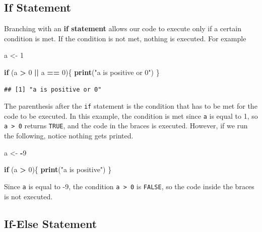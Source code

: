 \documentclass[
]{book}
\newenvironment{Shaded}{\begin{snugshade}}{\end{snugshade}}
\newcommand{\ControlFlowTok}[1]{\textcolor[rgb]{0.13,0.29,0.53}{\textbf{#1}}}
\newcommand{\DecValTok}[1]{\textcolor[rgb]{0.00,0.00,0.81}{#1}}
\newcommand{\FunctionTok}[1]{\textcolor[rgb]{0.13,0.29,0.53}{\textbf{#1}}}
\newcommand{\NormalTok}[1]{#1}
\newcommand{\OtherTok}[1]{\textcolor[rgb]{0.56,0.35,0.01}{#1}}
\newcommand{\SpecialCharTok}[1]{\textcolor[rgb]{0.81,0.36,0.00}{\textbf{#1}}}
\newcommand{\StringTok}[1]{\textcolor[rgb]{0.31,0.60,0.02}{#1}}
\theoremstyle{definition}
\theoremstyle{definition}
\theoremstyle{definition}
\theoremstyle{definition}
\theoremstyle{remark}
\begin{document}
\hypertarget{if-statement}{%
\subsection{If Statement}\label{if-statement}}

Branching with an \textbf{if statement} allows our code to execute only if a certain condition is met. If the condition is not met, nothing is executed. For example

\begin{Shaded}
\begin{Highlighting}[]
\NormalTok{a }\OtherTok{\textless{}{-}} \DecValTok{1}

\ControlFlowTok{if}\NormalTok{ (a }\SpecialCharTok{\textgreater{}} \DecValTok{0} \SpecialCharTok{||}\NormalTok{ a }\SpecialCharTok{==} \DecValTok{0}\NormalTok{)\{}
  \FunctionTok{print}\NormalTok{(}\StringTok{"a is positive or 0"}\NormalTok{)}
\NormalTok{\}}
\end{Highlighting}
\end{Shaded}

\begin{verbatim}
## [1] "a is positive or 0"
\end{verbatim}

The parenthesis after the \texttt{if} statement is the condition that has to be met for the code to be executed. In this example, the condition is met since \texttt{a} is equal to 1, so \texttt{a\ \textgreater{}\ 0} returns \texttt{TRUE}, and the code in the braces is executed. However, if we run the following, notice nothing gets printed.

\begin{Shaded}
\begin{Highlighting}[]
\NormalTok{a }\OtherTok{\textless{}{-}} \SpecialCharTok{{-}}\DecValTok{9}

\ControlFlowTok{if}\NormalTok{ (a }\SpecialCharTok{\textgreater{}} \DecValTok{0}\NormalTok{)\{}
  \FunctionTok{print}\NormalTok{(}\StringTok{"a is positive"}\NormalTok{)}
\NormalTok{\}}
\end{Highlighting}
\end{Shaded}

Since \texttt{a} is equal to -9, the condition \texttt{a\ \textgreater{}\ 0} is \texttt{FALSE}, so the code inside the braces is not executed.

\hypertarget{if-else-statement}{%
\subsection{If-Else Statement}\label{if-else-statement}}
\end{document}
